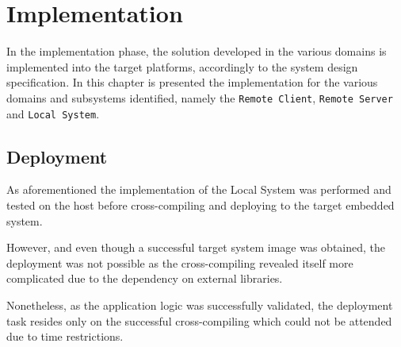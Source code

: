 \chapter{Implementation}
\label{cha:implementation}
In the implementation phase, the solution developed in the various domains is
implemented into the target platforms, accordingly to the system design
specification. In this chapter is presented the implementation for the various
domains and subsystems identified, namely the \texttt{Remote Client},
\texttt{Remote Server} and
\texttt{Local System}.






\section{Deployment}
\label{sec:deployment}
As aforementioned the implementation of the Local System was performed and
tested on the host before cross-compiling and deploying to the target embedded
system.

However, and even though a successful target system image was obtained, the deployment was not possible as the cross-compiling revealed itself
more complicated due to the dependency on external libraries.

Nonetheless, as the application logic was successfully validated, the deployment
task resides only on the successful cross-compiling which could not be attended
due to time restrictions.
